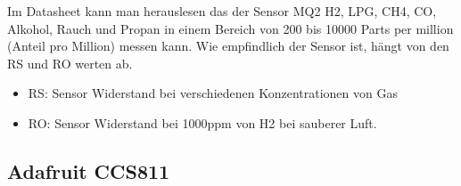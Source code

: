 \cite{MQ_Sensoren}
\newline 

Im Datasheet \cite{MQ_Datasheet} kann man herauslesen das der Sensor MQ2 \cite{MQ_Sensoren} H2, LPG, CH4, CO, Alkohol, Rauch und Propan in einem Bereich von 200 bis 10000 Parts per million (Anteil pro Million) messen kann. Wie empfindlich der Sensor ist, hängt von den RS und RO werten ab.

\begin{itemize}
	\item RS: Sensor Widerstand bei verschiedenen Konzentrationen von Gas
	\item RO: Sensor Widerstand bei 1000ppm von H2 bei sauberer Luft.
\end{itemize}

\subsection{Adafruit CCS811}

